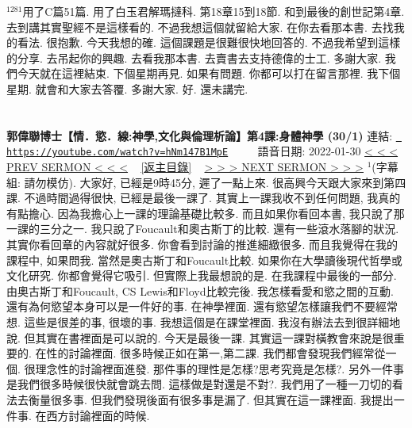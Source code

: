 \documentclass{book}
\begin{document}
$^{1281}$用了C篇51篇.
用了白玉君解瑪撻科.
第18章15到18節.
和到最後的創世記第4章.
去到講其實聖經不是這樣看的.
不過我想這個就留給大家.
在你去看那本書.
去找我的看法.
很抱歉.
今天我想的確.
這個課題是很難很快地回答的.
不過我希望到這樣的分享.
去吊起你的興趣.
去看我那本書.
去賣書去支持德偉的士工.
多謝大家.
我們今天就在這裡結束.
下個星期再見.
如果有問題.
你都可以打在留言那裡.
我下個星期.
就會和大家去答覆.
多謝大家.
好.
還未講完.
\newpage



\section{}
\label{sec:hNm147B1MpE}
\textbf{郭偉聯博士【情．慾．線:神學,文化與倫理析論】第4課:身體神學 (30/1)}
\newline
\newline
連結: \href{https://youtube.com/watch?v=hNm147B1MpE}{\texttt{ https://youtube.com/watch?v=hNm147B1MpE}} ~~~~ 語音日期: 2022-01-30 
\newline
\newline
\hyperref[sec:wqj8hNAtWGc]{\small{< < < PREV SERMON < < <}}
~
\hyperref[sec:index]{\small{[返主目錄]}}
~
\hyperref[sec:zhKDWS7eHdY]{\small{> > > NEXT SERMON > > >}}
\newline
\newline
$^{1}$(字幕組: 請勿模仿).
大家好, 已經是9時45分, 遲了一點上來.
很高興今天跟大家來到第四課.
不過時間過得很快, 已經是最後一課了.
其實上一課我收不到任何問題, 我真的有點擔心.
因為我擔心上一課的理論基礎比較多.
而且如果你看回本書, 我只說了那一課的三分之一.
我只說了Foucault和奧古斯丁的比較.
還有一些滾水落腳的狀況.
其實你看回章的內容就好很多.
你會看到討論的推進細緻很多.
而且我覺得在我的課程中, 如果問我.
當然是奧古斯丁和Foucault比較.
如果你在大學讀後現代哲學或文化研究.
你都會覺得它吸引.
但實際上我最想說的是.
在我課程中最後的一部分.
由奧古斯丁和Foucault, CS Lewis和Floyd比較完後.
我怎樣看愛和慾之間的互動.
還有為何慾望本身可以是一件好的事.
在神學裡面.
還有慾望怎樣讓我們不要經常想.
這些是很差的事, 很壞的事.
我想這個是在課堂裡面.
我沒有辦法去到很詳細地說.
但其實在書裡面是可以說的.
今天是最後一課.
其實這一課對橫教會來說是很重要的.
在性的討論裡面.
很多時候正如在第一,第二課.
我們都會發現我們經常從一個.
很理念性的討論裡面進發.
那件事的理性是怎樣?思考究竟是怎樣?.
另外一件事是我們很多時候很快就會跳去問.
這樣做是對還是不對?.
我們用了一種一刀切的看法去衡量很多事.
但我們發現後面有很多事是漏了.
但其實在這一課裡面.
我提出一件事.
在西方討論裡面的時候.
\end{document}
